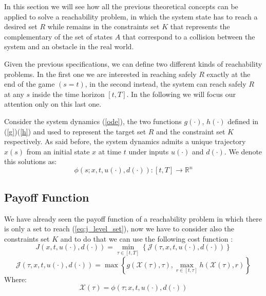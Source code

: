 In this section we will see how all the previous theoretical concepts can be applied to solve a reachability problem, in which the system state has to reach a desired set $R$ while remains in the constraints set $K$ that represents the complementary of the set of states $A$ that correspond to a collision between the system and an obstacle in the real world.

Given the previous specifications, we can define two different kinds of reachability problems. In the first one we are interested in reaching safely $R$ exactly at the end of the game $(s=t)$, in the second instead, the system can reach safely $R$ at any $s$ inside the time horizon $[t, T]$. In the following we will focus our attention only on this last one.

Consider the system dynamics (\ref{ode}), the two functions $g(\cdot)$, $h(\cdot)$ defined in (\ref{g})(\ref{h}) and used to represent the target set $R$ and the constraint set $K$ respectively. As said before, the system dynamics admits a unique trajectory $x(s)$ from an initial state $x$ at time $t$ under inputs $u(\cdot)$ and $d(\cdot)$. We denote this solutions as:
\[
    \phi(s; x, t, u(\cdot), d(\cdot)) : [t, T] \rightarrow \mathbb{R}^n
\]

\subsection{Payoff Function}
We have already seen the payoff function of a reachability problem in which there is only a set to reach (\ref{eq:j_level_set}), now we have to consider also the constraints set $K$ and to do that we can use the following cost function \cite{new_paper}:
\begin{equation}
    \label{j_ras}
    J(x, t, u(\cdot), d(\cdot)) =  
        \min_{\tau \in [t, T]}
        \left\{
            \mathcal{J}(\tau, x, t, u(\cdot), d(\cdot))
        \right\}
\end{equation}
\begin{equation}
    \label{j_ras}
    \mathcal{J}(\tau, x, t, u(\cdot), d(\cdot)) =  
        \max
        \left\{
            g(\mathcal{X}(\tau), \tau), \max_{r \in [t, \tau]}h(\mathcal{X}(\tau), r)            
        \right\}
\end{equation}
Where: 
\[\mathcal{X}(\tau)=\phi(\tau; x, t, u(\cdot), d(\cdot))\]

